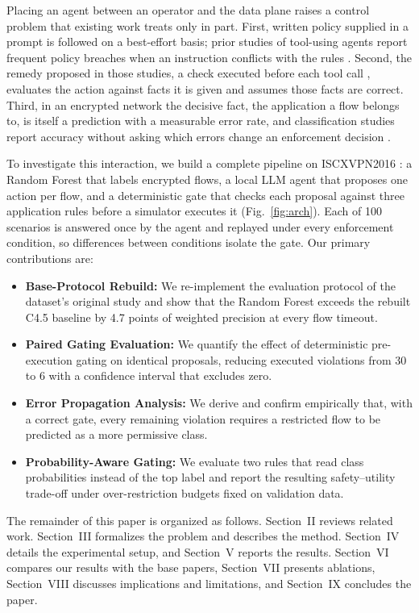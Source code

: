 \documentclass[conference]{IEEEtran}
\begin{document}
Placing an agent between an operator and the data plane raises a control problem that existing work treats only in part. First, written policy supplied in a prompt is followed on a best-effort basis; prior studies of tool-using agents report frequent policy breaches when an instruction conflicts with the rules \cite{zwerdling2025,sah2026verifier}. Second, the remedy proposed in those studies, a check executed before each tool call \cite{zwerdling2025,wang2026agentspec}, evaluates the action against facts it is given and assumes those facts are correct. Third, in an encrypted network the decisive fact, the application a flow belongs to, is itself a prediction with a measurable error rate, and classification studies report accuracy without asking which errors change an enforcement decision \cite{drapergil2016,elshewey2025}.

To investigate this interaction, we build a complete pipeline on ISCXVPN2016 \cite{drapergil2016}: a Random Forest that labels encrypted flows, a local LLM agent that proposes one action per flow, and a deterministic gate that checks each proposal against three application rules before a simulator executes it (Fig.~\ref{fig:arch}). Each of 100 scenarios is answered once by the agent and replayed under every enforcement condition, so differences between conditions isolate the gate. Our primary contributions are:
\begin{itemize}
\item \textbf{Base-Protocol Rebuild:} We re-implement the evaluation protocol of the dataset's original study and show that the Random Forest exceeds the rebuilt C4.5 baseline by 4.7 points of weighted precision at every flow timeout.
\item \textbf{Paired Gating Evaluation:} We quantify the effect of deterministic pre-execution gating on identical proposals, reducing executed violations from 30 to 6 with a confidence interval that excludes zero.
\item \textbf{Error Propagation Analysis:} We derive and confirm empirically that, with a correct gate, every remaining violation requires a restricted flow to be predicted as a more permissive class.
\item \textbf{Probability-Aware Gating:} We evaluate two rules that read class probabilities instead of the top label and report the resulting safety--utility trade-off under over-restriction budgets fixed on validation data.
\end{itemize}

The remainder of this paper is organized as follows. Section~II reviews related work. Section~III formalizes the problem and describes the method. Section~IV details the experimental setup, and Section~V reports the results. Section~VI compares our results with the base papers, Section~VII presents ablations, Section~VIII discusses implications and limitations, and Section~IX concludes the paper.
\end{document}
